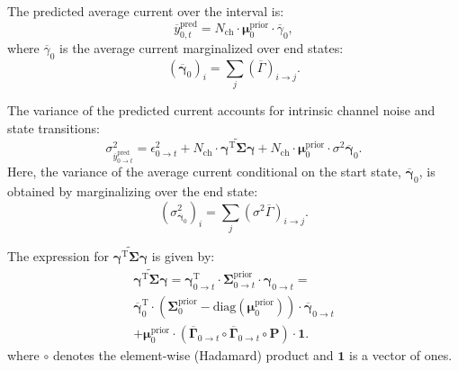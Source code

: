 \documentclass[pdflatex,sn-mathphys-num]{sn-jnl}%
\theoremstyle{thmstyleone}%
\theoremstyle{thmstyletwo}%
\theoremstyle{thmstylethree}%
\begin{document}
The predicted average current over the interval is:
\begin{equation}
	\overline{y}^{\text{pred}}_{0,t} = N_{\text{ch}} \cdot \mathbf{\mu}^{\text{prior}}_{0} \cdot \overline{\gamma}_{0},
	\label{eq:macro_interval_predicted_y}
\end{equation}
where \( \overline{\gamma}_{0} \) is the average current marginalized over end states:
\begin{equation}
	(\overline{\mathbf{\gamma}}_{0})_i = \sum_j (\overline{\Gamma})_{i \rightarrow j}.
\end{equation}

The variance of the predicted current accounts for intrinsic channel noise and state transitions:
\begin{equation}
	\sigma^2_{\overline{y}^{\text{pred}}_{0 \rightarrow t}} = \epsilon^2_{0 \rightarrow t} + N_{\text{ch}} \cdot \widetilde{\mathbf{\gamma}^{\mathrm{T}} \mathbf{\Sigma}\mathbf{\gamma}} + 
	N_{\text{ch}} \cdot \mathbf{\mu}^{\mathrm{prior}}_{0} \cdot {\sigma^2 \overline{\mathbf{\gamma}}}_{0}.
	\label{eq:macro_interval_sigma_pred}
\end{equation}
Here, the variance of the average current conditional on the start state, \( \overline{\mathbf{\gamma}}_{0} \), is obtained by marginalizing over the end state:
\begin{equation}
	(\sigma^2_{\overline{\mathbf{\gamma}}_{0}})_i = \sum_j (\sigma^2 \overline{\Gamma})_{i \rightarrow j}.
	\label{eq:sigma_gamma_i}
\end{equation}

The expression for \( \widetilde{\mathbf{\gamma}^{\mathrm{T}} \mathbf{\Sigma}\mathbf{\gamma}} \) is given by:
\begin{multline}
	\widetilde{\mathbf{\gamma}^{\mathrm{T}} \mathbf{\Sigma}\mathbf{\gamma}}=   \mathbf{\gamma}^{\mathrm{T}}_{0 \rightarrow t} \cdot \mathbf{\Sigma}^{\mathrm{prior}}_{0 \rightarrow t} \cdot \mathbf{\gamma}_{0 \rightarrow t} = \\
	\overline{\mathbf{\gamma}}_{0}^{\mathrm{T}} \cdot 
	\left( \mathbf{\Sigma}^{\mathrm{prior}}_{0} - \mathrm{diag}(\mathbf{\mu}^{\mathrm{prior}}_0) \right) \cdot 
	\overline{\mathbf{\gamma}}_{0 \rightarrow t} \\
	+ \mathbf{\mu}^{\mathrm{prior}}_0 \cdot \left( \overline{\mathbf{\Gamma}}_{0 \rightarrow t} \circ \overline{\mathbf{\Gamma}}_{0 \rightarrow t} \circ \mathbf{P} \right) \cdot \mathbf{1}.
	\label{eq:simplified_meta_state}
\end{multline}
where \( \circ \) denotes the element-wise (Hadamard) product and \( \mathbf{1} \) is a vector of ones.
\end{document}
